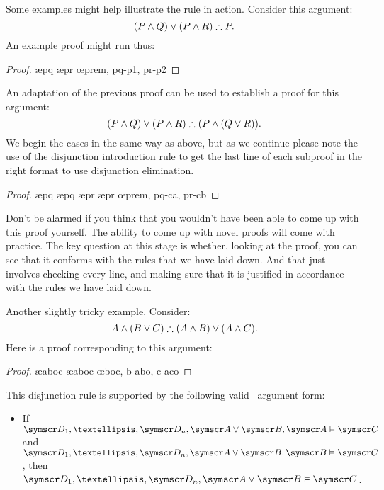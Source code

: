 Some examples might help illustrate the rule in action. Consider this argument:
$$(P \wedge Q) \vee (P \wedge R) \mathrel{\therefore} P.$$
An example proof might run thus:
	\begin{proof}
			\open
				\ae{pq}
			\close
			\open
				\ae{pr}
			\close
		\oe{prem, pq-p1, pr-p2}
	\end{proof}
An adaptation of the previous proof can be used to establish a proof for this argument: $$(P \wedge Q) \vee (P \wedge R) \mathrel{\therefore} (P \wedge(Q \vee R)).$$
We begin the cases in the same way as above, but as we continue please note the use of the disjunction introduction rule to get the last line of each subproof in the right format to use disjunction elimination. 
	\begin{proof}
			\open
				\ae{pq}
				\ae{pq}
			\close
			\open
				\ae{pr}
				\ae{pr}
			\close
		\oe{prem, pq-ca, pr-cb}
	\end{proof}

Don't be alarmed if you think that you wouldn't have been able to come up with this proof yourself. The ability to come up with novel proofs will come with practice. The key question at this stage is whether, looking at the proof, you can see that it conforms with the rules that we have laid down. And that just involves checking every line, and making sure that it is justified in accordance with the rules we have laid down.

Another slightly tricky example. Consider:
	$$ A \wedge (B \vee C) \mathrel{\therefore} (A \wedge B) \vee (A \wedge C).$$
Here is a proof corresponding to this argument:
	\begin{proof}
		\ae{aboc}
		\ae{aboc}
		\open
		\close
		\open
		\close
	\oe{boc, b-abo, c-aco}
	\end{proof}


This disjunction rule is supported by the following valid \TFL\ argument form: \begin{itemize}
	\item If $\meta{D}_{1},…,\meta{D}_{n},\meta{A}\eor\meta{B},\meta{A}\vDash\meta{C}$ and $\meta{D}_{1},…,\meta{D}_{n},\meta{A}\eor\meta{B},\meta{B}\vDash\meta{C}$, then $\meta{D}_{1},…,\meta{D}_{n},\meta{A}\eor\meta{B}\vDash\meta{C}$.
\end{itemize}


